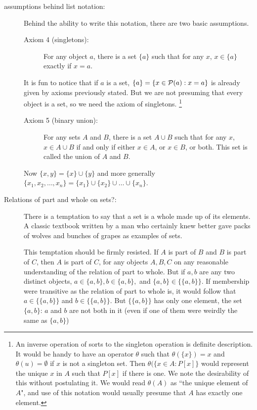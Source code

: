 \documentclass[12pt]{article}
\begin{document}
\begin{description}
\item[assumptions behind list notation:]

Behind the ability to write this notation, there are two basic assumptions.

\begin{description}

\item[Axiom 4 (singletons):]  For any object $a$, there is a set $\{a\}$ such that for any $x$, $x \in \{a\}$ exactly if $x=a$.

\end{description}

It is fun to notice that if $a$ is a set, $\{a\} = \{x \in {\cal P}(a):x=a\}$ is already given by axioms previously stated.
But we are not presuming that every object is a set, so we need the axiom of singletons. \footnote{An inverse operation of sorts to the singleton operation is definite description.  It would be handy to have an operator
$\theta$ such that $\theta(\{x\}) = x$ and $\theta(u) = \emptyset$ if $x$ is not a singleton set.  Then $\theta(\{x \in A:P[x]\}$ would represent the unique $x$ in $A$ such that $P[x]$ if there is one.   We note the desirability of this without postulating it.  We would read $\theta(A)$ as ``the unique element of $A$", and use of this notation would usually presume
that $A$ has exactly one element.}

\begin{description}
\item[Axiom 5 (binary union):]  For any sets $A$ and $B$, there is a set $A \cup B$ such that for any $x$, $x \in A \cup B$ if and only if 
either $x \in A$, or $x \in B$, or both.  This set is called the union of $A$ and $B$.
\end{description}

Now $\{x,y\} = \{x\} \cup \{y\}$ and more generally $\{x_1,x_2,\ldots,x_n\} = \{x_1\} \cup \{x_2\} \cup \ldots \cup \{x_n\}$.

\item[Relations of part and whole on sets?:]  There is a temptation to say that a set is a whole made up of its elements.
A classic textbook written by a man who certainly knew better gave packs of wolves and bunches of grapes as examples of sets.

This temptation should be firmly resisted.  If $A$ is part of $B$ and $B$ is part of $C$, then $A$ is part of $C$, for any objects $A,B,C$ on any reasonable understanding of the relation of part to whole.  But if $a,b$ are any two distinct objects, $a \in \{a,b\}, b \in \{a,b\},$ and $\{a,b\} \in \{\{a,b\}\}$.  If membership were transitive as the relation of part to whole is, it would follow that $a \in \{\{a,b\}\}$ and $b \in \{\{a,b\}\}$.  But $\{\{a,b\}\}$ has only one element, the set $\{a,b\}$:  $a$ and $b$ are not both in it (even if one of them were weirdly the same as $\{a,b\}$)


\end{description}
\end{document}
